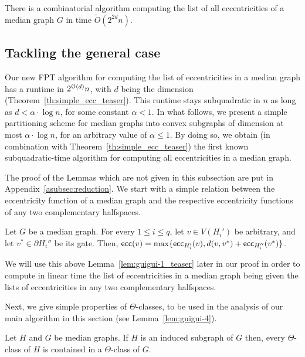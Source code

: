 \documentclass[a4paper,UKenglish,numberwithinsect,cleveref, autoref,anonymous]{lipics-v2021}
\newcommand{\ecc}{\mbox{\textsf{ecc}}}
\begin{document}
\begin{theorem}[\ref{th:simple_ecc}]
There is a combinatorial algorithm computing the list of all eccentricities of a median graph $G$ in time $\tilde{O}(2^{2d}n)$.
\label{th:simple_ecc_teaser}
\end{theorem}

\subsection{Tackling the general case} \label{subsec:reduction}

Our new FPT algorithm for computing the list of eccentricities in a median graph has a runtime in $2^{{\cal O}(d)}n$, with $d$ being the dimension (Theorem~\ref{th:simple_ecc_teaser}). 
This runtime stays subquadratic in $n$ as long as $d < \alpha \cdot \log{n}$, for some constant $\alpha < 1$.
In what follows, we present a simple partitioning scheme for median graphs into convex subgraphs of dimension at most $\alpha \cdot \log{n}$, for an arbitrary value of $\alpha \leq 1$.
By doing so, we obtain (in combination with Theorem~\ref{th:simple_ecc_teaser}) the first known subquadratic-time algorithm for computing all eccentricities in a median graph.

The proof of the Lemmas which are not given in this subsection are put in Appendix~\ref{asubsec:reduction}. We start with a simple relation between the eccentricity function of a median graph and the respective eccentricity functions of any two complementary halfspaces.

\begin{lemma}[\ref{lem:guigui-1}]\label{lem:guigui-1_teaser}
Let $G$ be a median graph.
For every $1 \leq i \leq q$, let $v \in V(H_i')$ be arbitrary, and let $v^* \in \partial H_i''$ be its gate.
Then, $\ecc(v) = \max\{\ecc_{H_i'}(v), d(v,v^*) + \ecc_{H_i''}(v^*)\}$.
\end{lemma}

We will use this above Lemma~\ref{lem:guigui-1_teaser} later in our proof in order to compute in linear time the list of eccentricities in a median graph being given the lists of eccentricities in any two complementary halfspaces.

Next, we give simple properties of $\Theta$-classes, to be used in the analysis of our main algorithm in this section (see Lemma~\ref{lem:guigui-4}).

\begin{lemma}[\ref{lem:guigui-2}]\label{lem:guigui-2_teaser}
Let $H$ and $G$ be median graphs.
If $H$ is an induced subgraph of $G$ then, every $\Theta$-class of $H$ is contained in a $\Theta$-class of $G$.
\end{lemma}
\end{document}
